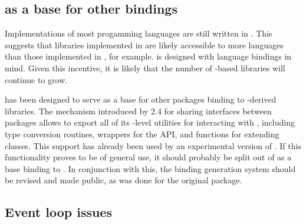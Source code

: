 \documentclass[article,shortnames]{jss}
\begin{document}

\subsection[RGtk2 as a base for other GObject bindings]{ as
a base for other  bindings}


Implementations of most progamming languages are still written in
. This suggests that libraries implemented in 
are likely accessible to more languages than those implemented in
, for example.  is designed with language
bindings in mind.
Given this incentive, it is likely that the number of
-based libraries will continue to grow.

 has been designed to serve as a base for other
packages binding to -derived libraries. The mechanism
introduced
by  2.4 for sharing  interfaces between
packages allows
 to export all of its -level utilities for 
interacting with , including type conversion routines,
wrappers
for the  API, and functions for extending 
classes.
This support has already been used by an experimental version of
\citep{ggobi-beta}. If this functionality proves to be of general use, 
it should probably be split out of  as a base binding to
.
In conjunction with this, the binding generation system should be
revised
and made public, as was done for the original  package.

\subsection{Event loop issues}
\end{document}
